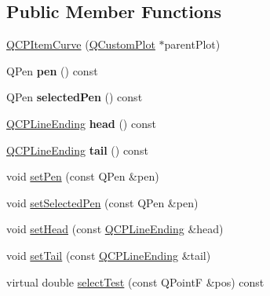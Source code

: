 \subsection*{Public Member Functions}
\begin{DoxyCompactItemize}
\item 
\hyperlink{classQCPItemCurve_ac9b7508bb5c8827e1a7a6199f8c82bec}{Q\-C\-P\-Item\-Curve} (\hyperlink{classQCustomPlot}{Q\-Custom\-Plot} $\ast$parent\-Plot)
\item 
\hypertarget{classQCPItemCurve_abc6321e55a9ba1a0c7df407843dfa252}{Q\-Pen {\bfseries pen} () const }\label{classQCPItemCurve_abc6321e55a9ba1a0c7df407843dfa252}

\item 
\hypertarget{classQCPItemCurve_abd8b8be5b13bc4dafec4c1758c281336}{Q\-Pen {\bfseries selected\-Pen} () const }\label{classQCPItemCurve_abd8b8be5b13bc4dafec4c1758c281336}

\item 
\hypertarget{classQCPItemCurve_afc067f0d1e60cd04812f2c2c7fdf36c3}{\hyperlink{classQCPLineEnding}{Q\-C\-P\-Line\-Ending} {\bfseries head} () const }\label{classQCPItemCurve_afc067f0d1e60cd04812f2c2c7fdf36c3}

\item 
\hypertarget{classQCPItemCurve_a9adddfcc5275be0cf27e3c0c31c37c1a}{\hyperlink{classQCPLineEnding}{Q\-C\-P\-Line\-Ending} {\bfseries tail} () const }\label{classQCPItemCurve_a9adddfcc5275be0cf27e3c0c31c37c1a}

\item 
void \hyperlink{classQCPItemCurve_a034be908440aec785c34b92843461221}{set\-Pen} (const Q\-Pen \&pen)
\item 
void \hyperlink{classQCPItemCurve_a375b917669f868c5a106bf2f1ab7c26d}{set\-Selected\-Pen} (const Q\-Pen \&pen)
\item 
void \hyperlink{classQCPItemCurve_a08a30d9cdd63995deea3d9e20430676f}{set\-Head} (const \hyperlink{classQCPLineEnding}{Q\-C\-P\-Line\-Ending} \&head)
\item 
void \hyperlink{classQCPItemCurve_ac3488d8b1a6489c845dc5bff3ef71124}{set\-Tail} (const \hyperlink{classQCPLineEnding}{Q\-C\-P\-Line\-Ending} \&tail)
\item 
virtual double \hyperlink{classQCPItemCurve_ae54055ee1070735155166ecb887a9316}{select\-Test} (const Q\-Point\-F \&pos) const 
\end{DoxyCompactItemize}
